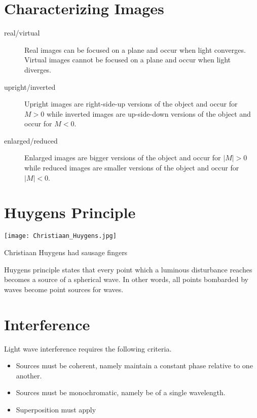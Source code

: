 \section{Characterizing Images}
\begin{description}
\item[real/virtual] Real images can be focused on a plane and occur when light converges.  Virtual images cannot be focused on a plane and occur when light diverges.
\item[upright/inverted] Upright images are right-side-up versions of the object and occur for $M>0$ while inverted images are up-side-down versions of the object and occur for $M<0$.
\item[enlarged/reduced] Enlarged images are bigger versions of the object and occur for $|M|>0$ while reduced images are smaller versions of the object and occur for $|M|<0$.
\end{description}

\newpage


\section{Huygens Principle}
\begin{marginfigure}[0pt]
  \texttt{[image: Christiaan\_Huygens.jpg]}
  \caption{Christiaan Huygens had sausage fingers}
  \label{fig:marginfig}
\end{marginfigure}
Huygens principle states that every point which a luminous disturbance reaches becomes a source of a spherical wave.  In other words, all points bombarded by waves become point sources for waves.


\section{Interference}
Light wave interference requires the following criteria.
\begin{itemize}
  \item Sources must be coherent, namely maintain a constant phase relative to one another.
  \item Sources must be monochromatic, namely be of a single wavelength.
  \item Superposition must apply
\end{itemize}

